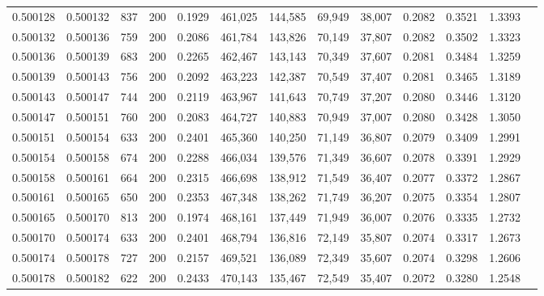 \begin{tabular}{rrrrrrrrrrrrr}
0.500128 & 0.500132 &   837 & 200 &                                     0.1929 & 461,025 & 144,585 &  69,949 &  38,007 & 0.2082 & 0.3521 & 1.3393 \\
0.500132 & 0.500136 &   759 & 200 &                                     0.2086 & 461,784 & 143,826 &  70,149 &  37,807 & 0.2082 & 0.3502 & 1.3323 \\
0.500136 & 0.500139 &   683 & 200 &                                     0.2265 & 462,467 & 143,143 &  70,349 &  37,607 & 0.2081 & 0.3484 & 1.3259 \\
0.500139 & 0.500143 &   756 & 200 &                                     0.2092 & 463,223 & 142,387 &  70,549 &  37,407 & 0.2081 & 0.3465 & 1.3189 \\
0.500143 & 0.500147 &   744 & 200 &                                     0.2119 & 463,967 & 141,643 &  70,749 &  37,207 & 0.2080 & 0.3446 & 1.3120 \\
0.500147 & 0.500151 &   760 & 200 &                                     0.2083 & 464,727 & 140,883 &  70,949 &  37,007 & 0.2080 & 0.3428 & 1.3050 \\
0.500151 & 0.500154 &   633 & 200 &                                     0.2401 & 465,360 & 140,250 &  71,149 &  36,807 & 0.2079 & 0.3409 & 1.2991 \\
0.500154 & 0.500158 &   674 & 200 &                                     0.2288 & 466,034 & 139,576 &  71,349 &  36,607 & 0.2078 & 0.3391 & 1.2929 \\
0.500158 & 0.500161 &   664 & 200 &                                     0.2315 & 466,698 & 138,912 &  71,549 &  36,407 & 0.2077 & 0.3372 & 1.2867 \\
0.500161 & 0.500165 &   650 & 200 &                                     0.2353 & 467,348 & 138,262 &  71,749 &  36,207 & 0.2075 & 0.3354 & 1.2807 \\
0.500165 & 0.500170 &   813 & 200 &                                     0.1974 & 468,161 & 137,449 &  71,949 &  36,007 & 0.2076 & 0.3335 & 1.2732 \\
0.500170 & 0.500174 &   633 & 200 &                                     0.2401 & 468,794 & 136,816 &  72,149 &  35,807 & 0.2074 & 0.3317 & 1.2673 \\
0.500174 & 0.500178 &   727 & 200 &                                     0.2157 & 469,521 & 136,089 &  72,349 &  35,607 & 0.2074 & 0.3298 & 1.2606 \\
0.500178 & 0.500182 &   622 & 200 &                                     0.2433 & 470,143 & 135,467 &  72,549 &  35,407 & 0.2072 & 0.3280 & 1.2548 \\

\end{tabular}
